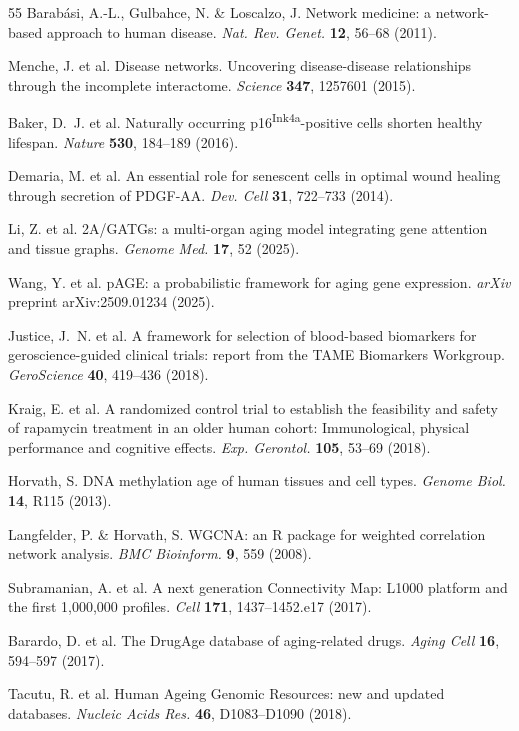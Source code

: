 \documentclass[11pt,a4paper]{article}
\begin{document}
\begin{thebibliography}{55}
Barab\'{a}si, A.-L., Gulbahce, N. \& Loscalzo, J.
Network medicine: a network-based approach to human disease.
\textit{Nat. Rev. Genet.} \textbf{12}, 56--68 (2011).

Menche, J. et al.
Disease networks. Uncovering disease-disease relationships through the incomplete interactome.
\textit{Science} \textbf{347}, 1257601 (2015).

Baker, D.~J. et al.
Naturally occurring p16\textsuperscript{Ink4a}-positive cells shorten healthy lifespan.
\textit{Nature} \textbf{530}, 184--189 (2016).

Demaria, M. et al.
An essential role for senescent cells in optimal wound healing through secretion of PDGF-AA.
\textit{Dev. Cell} \textbf{31}, 722--733 (2014).

Li, Z. et al.
2A/GATGs: a multi-organ aging model integrating gene attention and tissue graphs.
\textit{Genome Med.} \textbf{17}, 52 (2025).

Wang, Y. et al.
pAGE: a probabilistic framework for aging gene expression.
\textit{arXiv} preprint arXiv:2509.01234 (2025).

Justice, J.~N. et al.
A framework for selection of blood-based biomarkers for geroscience-guided clinical trials: report from the TAME Biomarkers Workgroup.
\textit{GeroScience} \textbf{40}, 419--436 (2018).

Kraig, E. et al.
A randomized control trial to establish the feasibility and safety of rapamycin treatment in an older human cohort: Immunological, physical performance and cognitive effects.
\textit{Exp. Gerontol.} \textbf{105}, 53--69 (2018).

Horvath, S.
DNA methylation age of human tissues and cell types.
\textit{Genome Biol.} \textbf{14}, R115 (2013).

Langfelder, P. \& Horvath, S.
WGCNA: an R package for weighted correlation network analysis.
\textit{BMC Bioinform.} \textbf{9}, 559 (2008).

Subramanian, A. et al.
A next generation Connectivity Map: L1000 platform and the first 1,000,000 profiles.
\textit{Cell} \textbf{171}, 1437--1452.e17 (2017).

Barardo, D. et al.
The DrugAge database of aging-related drugs.
\textit{Aging Cell} \textbf{16}, 594--597 (2017).

Tacutu, R. et al.
Human Ageing Genomic Resources: new and updated databases.
\textit{Nucleic Acids Res.} \textbf{46}, D1083--D1090 (2018).


\end{thebibliography}
\end{document}
